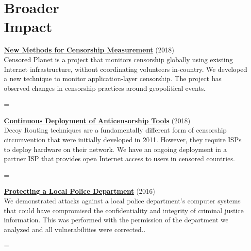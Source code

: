 \documentclass[margin,11pt]{res} %
\newenvironment{absolutelynopagebreak}
  {\par\nobreak\vfil\penalty0\vfilneg
   \vtop\bgroup}
  {\par\xdef\tpd{\the\prevdepth}\egroup
   \prevdepth=\tpd}
\begin{document}
{{{{{{%


\vspace{6pt}
\section{\large Broader\\Impact}

\begin{samepage}
\begin{absolutelynopagebreak}
\textbf{\href{https://censoredplanet.com}{New Methods for Censorship Measurement}} (2018)\\
Censored Planet is a project that monitors censorship globally using existing Internet infrastructure, without coordinating volunteers in-country. We developed a new technique to monitor application-layer censorship. The project has observed changes in censorship practices around geopolitical events.
\end{absolutelynopagebreak}
\end{samepage}

\begin{samepage}
\begin{absolutelynopagebreak}
\textbf{\href{https://refraction.networking}{Continuous Deployment of Anticensorship Tools}} (2018)\\
Decoy Routing techniques are a fundamentally different form of censorship circumvention that were initially developed in 2011. However, they require ISPs to deploy hardware on their network. We have an ongoing deployment in a partner ISP that provides open Internet access to users in censored countries.
\end{absolutelynopagebreak}
\end{samepage}

\begin{samepage}
\begin{absolutelynopagebreak}
\textbf{\href{https://benvds.com/papers/police.pdf}{Protecting a Local Police Department}} (2016)\\
We demonstrated attacks against a local police department's computer systems that could have compromised the confidentiality and integrity of criminal justice information. This was performed with the permission of the department we analyzed and all vulnerabilities were corrected..
\end{absolutelynopagebreak}
\end{samepage}


}}}}}}
\end{document}
